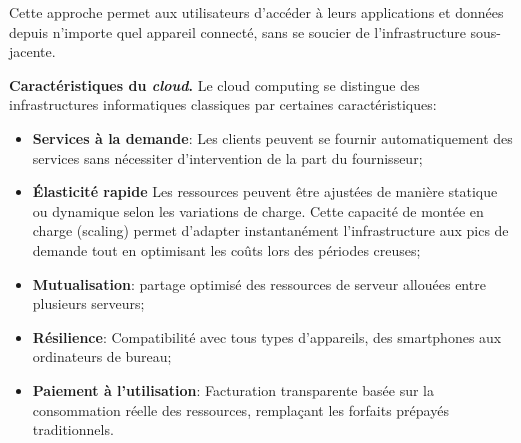 Cette approche permet aux utilisateurs d'accéder à leurs applications et données depuis n'importe quel appareil connecté, sans se soucier de l'infrastructure sous-jacente.

\textbf{Caractéristiques du \textit{cloud}.}
Le cloud computing se distingue des infrastructures informatiques classiques par certaines caractéristiques:
\begin{itemize}
    \item \textbf{Services à la demande}: Les clients peuvent se fournir automatiquement des services sans nécessiter d'intervention de la part du fournisseur;
    \item \textbf{Élasticité rapide} Les ressources peuvent être ajustées de manière statique ou dynamique selon les variations de charge. Cette capacité de montée en charge (scaling) permet d'adapter instantanément l'infrastructure aux pics de demande tout en optimisant les coûts lors des périodes creuses;
    \item \textbf{Mutualisation}: partage optimisé des ressources de serveur allouées entre plusieurs serveurs;
    \item \textbf{Résilience}: Compatibilité avec tous types d'appareils, des smartphones aux ordinateurs de bureau;
    \item \textbf{Paiement à l'utilisation}: Facturation transparente basée sur la consommation réelle des ressources, remplaçant les forfaits prépayés traditionnels.
\end{itemize}

